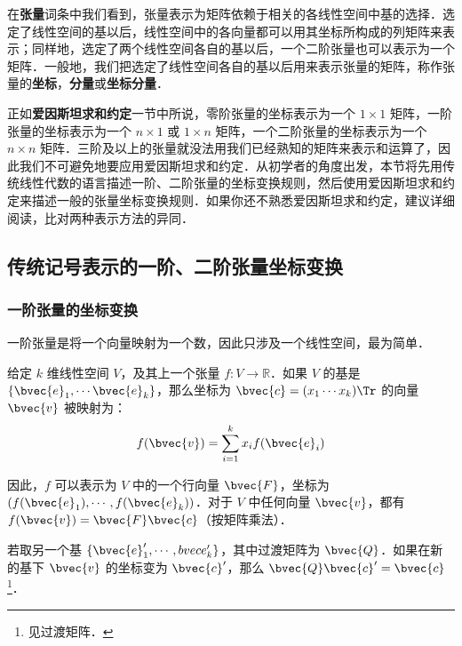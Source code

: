 

在\textbf{张量}词条中我们看到，张量表示为矩阵依赖于相关的各线性空间中基的选择．选定了线性空间的基以后，线性空间中的各向量都可以用其坐标所构成的列矩阵来表示；同样地，选定了两个线性空间各自的基以后，一个二阶张量也可以表示为一个矩阵．一般地，我们把选定了线性空间各自的基以后用来表示张量的矩阵，称作张量的\textbf{坐标}，\textbf{分量}或\textbf{坐标分量}．

正如\textbf{爱因斯坦求和约定}一节中所说，零阶张量的坐标表示为一个 $1\times 1$ 矩阵，一阶张量的坐标表示为一个 $n\times 1$ 或 $1\times n$ 矩阵，一个二阶张量的坐标表示为一个 $n\times n$ 矩阵．三阶及以上的张量就没法用我们已经熟知的矩阵来表示和运算了，因此我们不可避免地要应用爱因斯坦求和约定．从初学者的角度出发，本节将先用传统线性代数的语言描述一阶、二阶张量的坐标变换规则，然后使用爱因斯坦求和约定来描述一般的张量坐标变换规则．如果你还不熟悉爱因斯坦求和约定，建议详细阅读，比对两种表示方法的异同．

\subsection{传统记号表示的一阶、二阶张量坐标变换}
\subsubsection{一阶张量的坐标变换}
一阶张量是将一个向量映射为一个数，因此只涉及一个线性空间，最为简单．

给定 $k$ 维线性空间 $V$，及其上一个张量 $f:V\rightarrow\mathbb{R}$．如果 $V$ 的基是 $\{\bvec{e}_1, \cdots\bvec{e}_k\}$，那么坐标为 $\bvec{c}=(x_1\cdots x_k)\Tr$ 的向量 $\bvec{v}$ 被映射为：
\begin{equation}
f(\bvec{v})=\sum\limits_{i=1}^k x_if(\bvec{e}_i)
\end{equation}

因此，$f$ 可以表示为 $V$ 中的一个行向量 $\bvec{F}$，坐标为 $(f(\bvec{e}_1), \cdots, f(\bvec{e}_k))$．对于 $V$ 中任何向量 $\bvec{v}$，都有 $f(\bvec{v})=\bvec{F}\bvec{c}$（按矩阵乘法）．

若取另一个基 $\{\bvec{e}_1', \cdots, \\bvec{e}_k'\}$，其中过渡矩阵为 $\bvec{Q}$．如果在新的基下 $\bvec{v}$ 的坐标变为 $\bvec{c}'$，那么 $\bvec{Q}\bvec{c}'=\bvec{c}$\footnote{见过渡矩阵．}．

